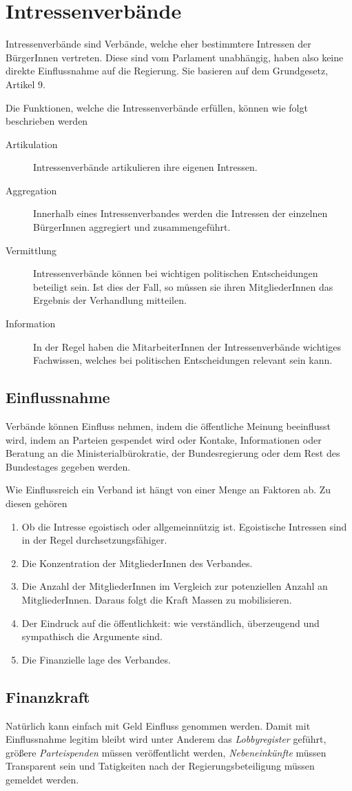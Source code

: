 \documentclass{article}
\begin{document}
\section{Intressenverbände}
Intressenverbände sind Verbände, welche eher bestimmtere Intressen der BürgerInnen vertreten. Diese sind vom Parlament unabhängig, haben also keine direkte Einflussnahme auf die Regierung. Sie basieren auf dem Grundgesetz, Artikel 9.
 
Die Funktionen, welche die Intressenverbände erfüllen, können wie folgt beschrieben werden 
\begin{description}
 \item[Artikulation] Intressenverbände artikulieren ihre eigenen Intressen.
 \item[Aggregation] Innerhalb eines Intressenverbandes werden die Intressen der einzelnen BürgerInnen aggregiert und zusammengeführt.
 \item[Vermittlung] Intressenverbände können bei wichtigen politischen Entscheidungen beteiligt sein. Ist dies der Fall, so müssen sie ihren MitgliederInnen das Ergebnis der Verhandlung mitteilen. 
 \item[Information] In der Regel haben die MitarbeiterInnen der Intressenverbände wichtiges Fachwissen, welches bei politischen Entscheidungen relevant sein kann.
\end{description}
 
\subsection{Einflussnahme}
Verbände können Einfluss nehmen, indem die öffentliche Meinung beeinflusst wird, indem an Parteien gespendet wird oder Kontake, Informationen oder Beratung an die Ministerialbürokratie, der Bundesregierung oder dem Rest des Bundestages gegeben werden. 
 
Wie Einflussreich ein Verband ist hängt von einer Menge an Faktoren ab. Zu diesen gehören
\begin{enumerate}
 \item Ob die Intresse egoistisch oder allgemeinnützig ist. Egoistische Intressen sind in der Regel durchsetzungsfähiger.
 \item Die Konzentration der MitgliederInnen des Verbandes.
 \item Die Anzahl der MitgliederInnen im Vergleich zur potenziellen Anzahl an MitgliederInnen. Daraus folgt die Kraft Massen zu mobilisieren.
 \item Der Eindruck auf die öffentlichkeit: wie verständlich, überzeugend und sympathisch die Argumente sind.
 \item Die Finanzielle lage des Verbandes. 
\end{enumerate} 
 
\subsection{Finanzkraft} 
Natürlich kann einfach mit Geld Einfluss genommen werden. Damit mit Einflussnahme legitim bleibt wird unter Anderem das \emph{Lobbyregister} geführt, größere \emph{Parteispenden} müssen veröffentlicht werden, \emph{Nebeneinkünfte} müssen Transparent sein und Tatigkeiten nach der Regierungsbeteiligung müssen gemeldet werden.   
\end{document}
